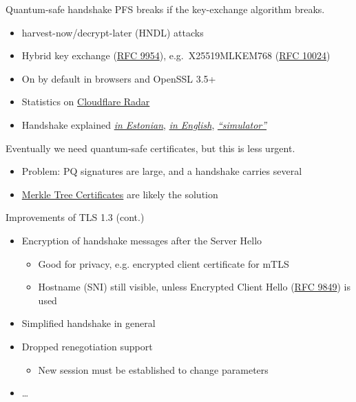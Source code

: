 \begin{frame}{Quantum-safe handshake}
  PFS breaks if the key-exchange algorithm breaks.
  \begin{itemize}[<+(1)->]
    \item harvest-now/decrypt-later (HNDL) attacks
    \item Hybrid key exchange (\href{https://datatracker.ietf.org/doc/html/rfc9954}{RFC 9954}), e.g.\ X25519MLKEM768 (\href{https://datatracker.ietf.org/doc/html/rfc10024}{RFC 10024})
    \item On by default in browsers and OpenSSL 3.5+
    \item Statistics on \href{https://radar.cloudflare.com/post-quantum}{Cloudflare Radar}
    \item Handshake explained \href{https://www.ria.ee/blogi/tls-13-votme-kvantkindel-hubriidkehtestus-x25519mlkem768}{\textit{in Estonian}}, \href{https://blog.cloudflare.com/post-quantum-for-all/}{\textit{in English}}, \href{https://www.pqctoday.com/learn/tls-basics/}{\textit{\enquote{simulator}}}
  \end{itemize}

  \vspace*{1em}

  \pause
  Eventually we need quantum-safe certificates, but this is less urgent.
  \begin{itemize}
    \item Problem: PQ signatures are large, and a handshake carries several
    \item \href{https://blog.cloudflare.com/pq-ca-with-mtcs}{Merkle Tree Certificates} are likely the solution
  \end{itemize}
\end{frame}

\begin{frame}{Improvements of TLS 1.3 (cont.)}
  \begin{itemize}[<+(1)->]
    \item Encryption of handshake messages after the Server Hello
    \begin{itemize}
      \item Good for privacy, e.g. encrypted client certificate for mTLS
      \item Hostname (SNI) still visible, unless Encrypted Client Hello (\href{https://datatracker.ietf.org/doc/html/rfc9849}{RFC 9849}) is used
    \end{itemize}
    \item Simplified handshake in general
    \item Dropped renegotiation support
    \begin{itemize}
      \item New session must be established to change parameters
    \end{itemize}
    \item \dots
  \end{itemize}
\end{frame}

